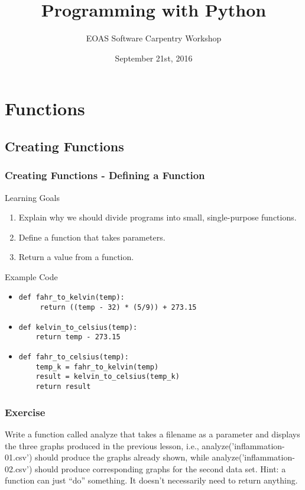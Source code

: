 \documentclass{beamer}
\title[Python]{Programming with Python}
\subtitle[]{EOAS Software Carpentry Workshop }
\date[Sep 2015]{September 21st, 2016}
\begin{document}
\section*{Functions}

\begin{frame}[plain]
\titlepage
\end{frame}


\subsection*{Creating Functions}

\begin{frame}[fragile]
\frametitle{Creating Functions - Defining a Function}
\begin{block}{Learning Goals}
\begin{enumerate}
\item Explain why we should divide programs into small, single-purpose functions.
\item Define a function that takes parameters.
\item Return a value from a function.
\end{enumerate}
\end{block}

\begin{block}{Example Code}
\begin{itemize}
\item
\begin{verbatim}
def fahr_to_kelvin(temp):
     return ((temp - 32) * (5/9)) + 273.15
\end{verbatim}
\item
\begin{verbatim}
def kelvin_to_celsius(temp):
    return temp - 273.15
\end{verbatim}

\item
\begin{verbatim}
def fahr_to_celsius(temp):
    temp_k = fahr_to_kelvin(temp)
    result = kelvin_to_celsius(temp_k)
    return result
\end{verbatim}
\end{itemize}
\end{block}
\end{frame}


\begin{frame}
\frametitle{Exercise}
Write a function called analyze that takes a filename as a parameter and displays the three graphs produced in the previous lesson, i.e., analyze('inflammation-01.csv') should produce the graphs already shown, while analyze('inflammation-02.csv') should produce corresponding graphs for the second data set. Hint: a function can just ``do'' something.  It doesn't necessarily need to return anything.
\end{frame}
\end{document}
